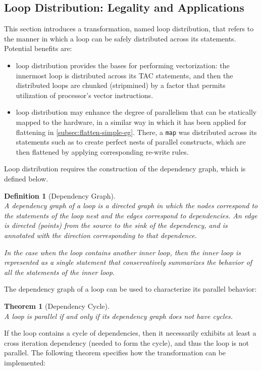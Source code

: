 \documentclass[acmsmall,review]{acmart}\settopmatter{printfolios=true,printccs=false,printacmref=false}
\newtheorem{mydef}{Definition}
\newtheorem{mytheo}{Theorem}
\begin{document}
\subsection{Loop Distribution: Legality and Applications}
\label{subsec:loop-distrib}

This section introduces a transformation, named loop 
distribution, that refers to the manner in which a loop can 
be safely distributed across its statements. 
Potential benefits are:
\begin{itemize}
    \item loop distribution provides the bases for performing 
        vectorization:
        the innermost loop is distributed across its TAC statements,
        and then the distributed loops are chunked (stripmined) 
        by a factor that permits utilization of processor's vector 
        instructions.
    \item loop distribution may enhance the degree of
        parallelism that can be statically mapped to the 
        hardware, in a similar way in which it has been 
        applied for flattening in \cref{subsec:flatten-simple-eg}.
        There, a \lstinline{map} was distributed across its
        statements such as to create perfect nests of parallel
        constructs, which are then flattened by applying
        corresponding re-write rules. 
\end{itemize}

Loop distribution requires the construction of the dependency
graph, which is defined below.

\begin{mydef}[Dependency Graph]\label{Dep-Graph}
$\mbox{ }$\\
A dependency graph of a loop is a directed graph in which 
the nodes correspond to the statements of the loop nest and the
edges correspond to dependencies. An edge is directed (points) 
from the source to the sink of the dependency, and is annotated
with the direction corresponding to that dependence. 

In the case when the loop contains another inner loop, then 
the inner loop is represented as a single statement that conservatively 
summarizes the behavior of all the statements of the inner loop.
\end{mydef}

The dependency graph of a loop can be used to characterize its
parallel behavior:
\begin{mytheo}[Dependency Cycle]\label{Dep-Cycle}
$\mbox{ }$\\
A loop is parallel {\em if and only if} its dependency graph
does not have cycles.
\end{mytheo}
If the loop contains a cycle of dependencies, then it necessarily
exhibits at least a cross iteration dependency (needed to form 
the cycle), and thus the loop is not parallel.  The following
theorem specifies how the transformation can be implemented:
\end{document}
